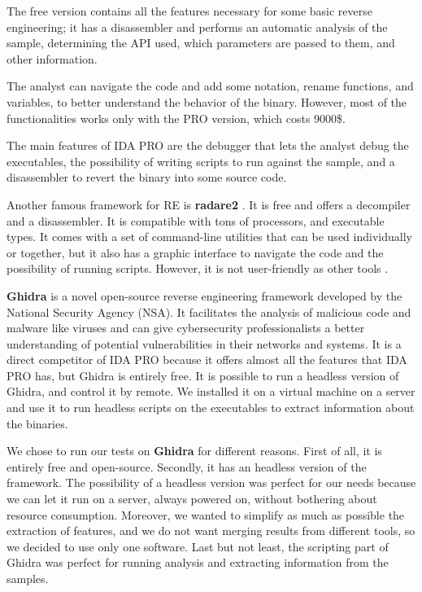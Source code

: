 The free version contains all the features necessary for some basic reverse engineering; it has a disassembler and performs an automatic analysis of the sample, determining the API used, which parameters are passed to them, and other information. 

The analyst can navigate the code and add some notation, rename functions, and variables, to better understand the behavior of the binary. However, most of the functionalities works only with the PRO version, which costs 9000\$.

The main features of IDA PRO \cite{ida} are the debugger that lets the analyst debug the executables, the possibility of writing scripts to run against the sample, and a disassembler to revert the binary into some source code. 


Another famous framework for RE is \textbf{radare2} \cite{radare2}. It is free and offers a decompiler and a disassembler.  It is compatible with tons of processors, and executable types. It comes with a set of command-line utilities that can be used individually or together, but it also has a graphic interface to navigate the code and the possibility of running scripts. However, it is not user-friendly as other tools .

\textbf{Ghidra} \cite{ghidra} is a novel open-source reverse engineering framework developed by the National Security Agency (NSA). It facilitates the analysis of malicious code and malware like viruses and can give cybersecurity professionalists a better understanding of potential vulnerabilities in their networks and systems. It is a direct competitor of IDA PRO because it offers almost all the features that IDA PRO has, but Ghidra is entirely free. It is possible to run a headless version of Ghidra, and control it by remote. We installed it on a virtual machine on a server and use it to run headless scripts on the executables to extract information about the binaries.

We chose to run our tests on \textbf{Ghidra} for different reasons. First of all, it is entirely free and open-source.
Secondly, it has an headless version of the framework. The possibility of a headless version was perfect for our needs because we can let it run on a server, always powered on, without bothering about resource consumption. 
Moreover, we wanted to simplify as much as possible the extraction of features, and we do not want merging results from different tools, so we decided to use only one software. 
Last but not least, the scripting part of Ghidra was perfect for running analysis and extracting information from the samples. 

